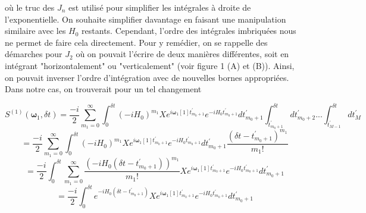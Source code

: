 
où le truc des $J_n$ est utilisé pour simplifier les intégrales à droite de l'exponentielle. On souhaite simplifier davantage en faisant une manipulation similaire avec les $H_0$ restants. Cependant, l'ordre des intégrales imbriquées nous ne permet de faire cela directement. Pour y remédier, on se rappelle des démarches pour $J_2$ où on pouvait l'écrire de deux manières différentes, soit en intégrant "horizontalement" ou "verticalement" (voir figure 1 (A) et (B)). Ainsi, on pouvait inverser l'ordre d'intégration avec de nouvelles bornes appropriées. Dans notre cas, on trouverait pour un tel changement

\begin{equation*}
    S^{(1)}(\boldsymbol{\omega}_1, \delta t) = \frac{-i}{2}\sum_{m_1= 0}^{\infty} \int_{0}^{\delta t}(-iH_0)^{m_1}Xe^{i\boldsymbol{\omega}_1[1]t^{'}_{m_0+1}} e^{-iH_0 t^{'}_{m_0 +1}}dt^{'}_{m_0 + 1}\int_{t^{'}_{m_0 +1}}^{\delta t}dt^{'}_{m_0+2}...\int_{t^{'}_{M-1}}^{\delta t}dt^{'}_{M}
\end{equation*}
\begin{equation*}
    = \frac{-i}{2}\sum_{m_1= 0}^{\infty} \int_{0}^{\delta t}(-iH_0)^{m_1}Xe^{i\boldsymbol{\omega}_1[1]t^{'}_{m_0+1}} e^{-iH_0 t^{'}_{m_0 +1}}dt^{'}_{m_0 + 1} \frac{(\delta t - t^{'}_{m_0 +1})^{m_1}}{m_1!}
\end{equation*}
\begin{equation*}
    = \frac{-i}{2}\int_{0}^{\delta t}\sum_{m_1= 0}^{\infty}\frac{(-iH_0(\delta t - t^{'}_{m_0 +1}))^{m_1}}{m_1!}Xe^{i\boldsymbol{\omega}_1[1]t^{'}_{m_0+1}} e^{-iH_0 t^{'}_{m_0 +1}}dt^{'}_{m_0 + 1}
\end{equation*}
\begin{equation*}
    = \frac{-i}{2}\int_{0}^{\delta t}e^{-iH_0(\delta t - t^{'}_{m_0+1})}Xe^{i\boldsymbol{\omega}_1[1]t^{'}_{m_0+1}} e^{-iH_0 t^{'}_{m_0 +1}}dt^{'}_{m_0 + 1}
\end{equation*}

